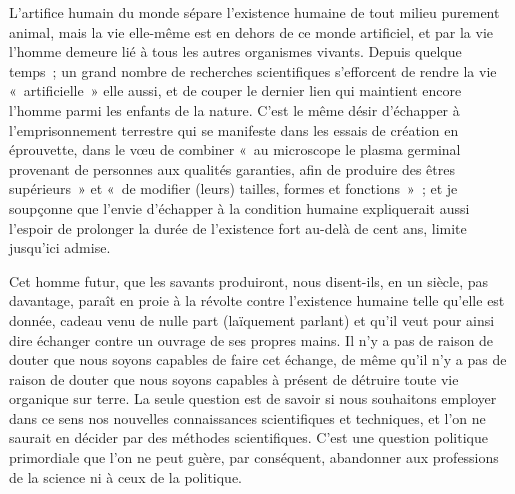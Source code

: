 {L'artifice humain du monde sépare l'existence humaine de tout milieu
purement animal, mais la vie elle-même est en dehors de ce monde
artificiel, et par la vie l'homme demeure lié à tous les autres
organismes vivants. Depuis quelque temps~; un grand nombre de
recherches scientifiques s'efforcent de rendre la vie
«~artificielle~» elle aussi, et de couper le dernier lien qui
maintient encore l'homme parmi les enfants de la nature. C'est le
même désir d'échapper à l'emprisonnement terrestre qui se manifeste
dans les essais de création en éprouvette, dans le vœu de combiner
«~au microscope le plasma germinal provenant de personnes aux
qualités garanties, afin de produire des êtres supérieurs~» et «~de
modifier (leurs) tailles, formes et fonctions~»~; et je soupçonne que
l'envie d'échapper à la condition humaine expliquerait aussi l'espoir
de prolonger la durée de l'existence fort au-delà de cent ans, limite
jusqu'ici admise.

Cet homme futur, que les savants produiront, nous disent-ils, en un
siècle, pas davantage, paraît en proie à la révolte contre
l'existence humaine telle qu'elle est donnée, cadeau venu de nulle
part (laïquement parlant) et qu'il veut pour ainsi dire échanger
contre un ouvrage de ses propres mains. Il n'y a pas de raison de
douter que nous soyons capables de faire cet échange, de même qu'il
n'y a pas de raison de douter que nous soyons capables à présent de
détruire toute vie organique sur terre. La seule question est de
savoir si nous souhaitons employer dans ce sens nos nouvelles
connaissances scientifiques et techniques, et l'on ne saurait en
décider par des méthodes scientifiques. C'est une question politique
primordiale que l'on ne peut guère, par conséquent, abandonner aux
professions de la science ni à ceux de la politique.
}

